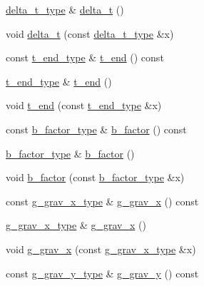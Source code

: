 \begin{DoxyCompactItemize}
\hyperlink{classsetting__t_ad2336c5ecdc0977272ba8126243d7977}{delta\+\_\+t\+\_\+type} \& \hyperlink{classsetting__t_ad4570ca7576e503c37af0c817554d928}{delta\+\_\+t} ()
\item 
void \hyperlink{classsetting__t_a77afd898e4ab19c5108af2ca0639c7d5}{delta\+\_\+t} (const \hyperlink{classsetting__t_ad2336c5ecdc0977272ba8126243d7977}{delta\+\_\+t\+\_\+type} \&x)
\item 
const \hyperlink{classsetting__t_ab27962fdbca01941c3b6c632bc7ac360}{t\+\_\+end\+\_\+type} \& \hyperlink{classsetting__t_ab071b6a9a8167cd2d23759578fe3cfa0}{t\+\_\+end} () const 
\item 
\hyperlink{classsetting__t_ab27962fdbca01941c3b6c632bc7ac360}{t\+\_\+end\+\_\+type} \& \hyperlink{classsetting__t_abcf4592fadac5384a23d56e36765bec9}{t\+\_\+end} ()
\item 
void \hyperlink{classsetting__t_aa5365bc7fd53bf5485c397a43a7751b1}{t\+\_\+end} (const \hyperlink{classsetting__t_ab27962fdbca01941c3b6c632bc7ac360}{t\+\_\+end\+\_\+type} \&x)
\item 
const \hyperlink{classsetting__t_afd5541e25ce3565005acb9c70bddda2d}{b\+\_\+factor\+\_\+type} \& \hyperlink{classsetting__t_a3c13330db0b0b66d440474bb6e5afa16}{b\+\_\+factor} () const 
\item 
\hyperlink{classsetting__t_afd5541e25ce3565005acb9c70bddda2d}{b\+\_\+factor\+\_\+type} \& \hyperlink{classsetting__t_aebabb37397fd717cf5bf7cac8735bb31}{b\+\_\+factor} ()
\item 
void \hyperlink{classsetting__t_acd8dbeef4cfd2ba9e8fe639bdfcbdc7e}{b\+\_\+factor} (const \hyperlink{classsetting__t_afd5541e25ce3565005acb9c70bddda2d}{b\+\_\+factor\+\_\+type} \&x)
\item 
const \hyperlink{classsetting__t_af2a0b22be63f361de8ba6df7313b1a68}{g\+\_\+grav\+\_\+x\+\_\+type} \& \hyperlink{classsetting__t_a50694c3505687d3351aad56253145f90}{g\+\_\+grav\+\_\+x} () const 
\item 
\hyperlink{classsetting__t_af2a0b22be63f361de8ba6df7313b1a68}{g\+\_\+grav\+\_\+x\+\_\+type} \& \hyperlink{classsetting__t_a646bf44225ffbd7f3e0bb8b6f182c27e}{g\+\_\+grav\+\_\+x} ()
\item 
void \hyperlink{classsetting__t_a3b5f3c553b6d8562b6587a9a99d296bd}{g\+\_\+grav\+\_\+x} (const \hyperlink{classsetting__t_af2a0b22be63f361de8ba6df7313b1a68}{g\+\_\+grav\+\_\+x\+\_\+type} \&x)
\item 
const \hyperlink{classsetting__t_a89b3c653de2dc5afa902042e34939589}{g\+\_\+grav\+\_\+y\+\_\+type} \& \hyperlink{classsetting__t_a0f2463d48913b5988f77beb070c43d53}{g\+\_\+grav\+\_\+y} () const 

\end{DoxyCompactItemize}
